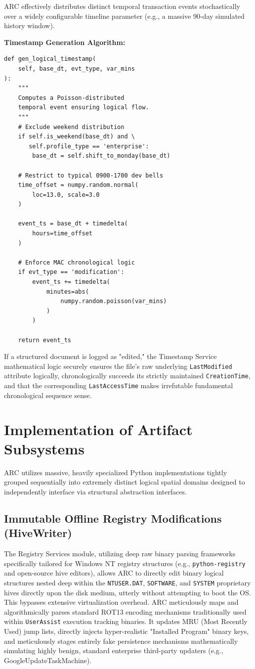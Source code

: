 \documentclass{ieeeaccess}
\begin{document}
ARC effectively distributes distinct temporal transaction events stochastically over a widely configurable timeline parameter (e.g., a massive 90-day simulated history window). 

\textbf{Timestamp Generation Algorithm:}
\begin{verbatim}
def gen_logical_timestamp(
    self, base_dt, evt_type, var_mins
):
    """
    Computes a Poisson-distributed 
    temporal event ensuring logical flow.
    """
    # Exclude weekend distribution 
    if self.is_weekend(base_dt) and \
       self.profile_type == 'enterprise':
        base_dt = self.shift_to_monday(base_dt)
        
    # Restrict to typical 0900-1700 dev bells
    time_offset = numpy.random.normal(
        loc=13.0, scale=3.0
    ) 
    
    event_ts = base_dt + timedelta(
        hours=time_offset
    )
    
    # Enforce MAC chronological logic
    if evt_type == 'modification':
        event_ts += timedelta(
            minutes=abs(
                numpy.random.poisson(var_mins)
            )
        )
        
    return event_ts
\end{verbatim}
If a structured document is logged as "edited," the Timestamp Service mathematical logic securely ensures the file's raw underlying \texttt{LastModified} attribute logically, chronologically succeeds its strictly maintained \texttt{CreationTime}, and that the corresponding \texttt{LastAccessTime} makes irrefutable fundamental chronological sequence sense.

\section{Implementation of Artifact Subsystems}

ARC utilizes massive, heavily specialized Python implementations tightly grouped sequentially into extremely distinct logical spatial domains designed to independently interface via structural abstraction interfaces.

\subsection{Immutable Offline Registry Modifications (HiveWriter)}
The Registry Services module, utilizing deep raw binary parsing frameworks specifically tailored for Windows NT registry structures (e.g., \texttt{python-registry} and open-source hive editors), allows ARC to directly edit binary logical structures nested deep within the \texttt{NTUSER.DAT}, \texttt{SOFTWARE}, and \texttt{SYSTEM} proprietary hives directly upon the disk medium, utterly without attempting to boot the OS. This bypasses extensive virtualization overhead. ARC meticulously maps and algorithmically parses standard ROT13 encoding mechanisms traditionally used within \texttt{UserAssist} execution tracking binaries. It updates MRU (Most Recently Used) jump lists, directly injects hyper-realistic "Installed Program" binary keys, and meticulously stages entirely fake persistence mechanisms mathematically simulating highly benign, standard enterprise third-party updaters (e.g., GoogleUpdateTaskMachine).
\end{document}
